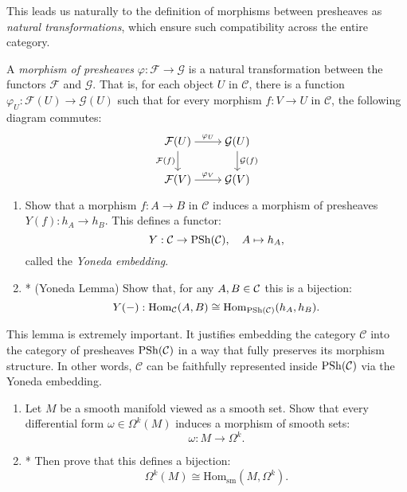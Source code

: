 This leads us naturally to the definition of morphisms between presheaves as \emph{natural transformations}, which ensure such compatibility across the entire category.

\begin{definition}
A \emph{morphism of presheaves} $\varphi: \mathcal{F} \to \mathcal{G}$ is a natural transformation between the functors $\mathcal{F}$ and $\mathcal{G}$. That is, for each object $U$ in $\mathcal{C}$, there is a function $\varphi_U: \mathcal{F}(U) \to \mathcal{G}(U)$ such that for every morphism $f: V \to U$ in $\mathcal{C}$, the following diagram commutes:
\[\begin{tikzcd}[ampersand replacement=\&,cramped]
  \mathcal{F}(U) \&  \mathcal{G}(U) \\
\mathcal{F}(V)   \& \mathcal{G}(V)
	\arrow["{\varphi_U}", from=1-1, to=1-2]
	\arrow["{\mathcal{F}(f)}"', from=1-1, to=2-1]
	\arrow["{\mathcal{G}(f)}", from=1-2, to=2-2]
	\arrow["{\varphi_V}", from=2-1, to=2-2]
\end{tikzcd}\]

\end{definition}
\begin{exercise}
\begin{enumerate}
    \item Show that a morphism $f: A \to B$ in $\mathcal{C}$ induces a morphism of presheaves $Y(f): h_A \to h_B$. This defines a functor:
    \[
    Y: \mathcal{C} \to \mathrm{PSh}(\mathcal{C}), \quad A \mapsto h_A,
    \]
    called the \emph{Yoneda embedding}.
    \item* (Yoneda Lemma) Show that, for any $A,B\in \mathcal{C}$ this is a bijection:
    \[
    Y(-): \mathrm{Hom}_{\mathcal{C}}(A, B) \cong \mathrm{Hom}_{\mathrm{PSh}(\mathcal{C})}(h_A, h_B).
    \]
\end{enumerate}
\end{exercise}

This lemma is extremely important. It justifies embedding the category $\mathcal{C}$ into the category of presheaves $\mathrm{PSh}(\mathcal{C})$ in a way that fully preserves its morphism structure. In other words, $\mathcal{C}$ can be faithfully represented inside $\mathrm{PSh}(\mathcal{C})$ via the Yoneda embedding.
\begin{exercise}
  \begin{enumerate}
    \item 
Let $M$ be a smooth manifold viewed as a smooth set. Show that every differential form $\omega \in \Omega^k(M)$ induces a morphism of smooth sets:
\[
\omega: M \to \Omega^k.
\]
\item* Then prove that this defines a bijection:
\[
\Omega^k(M) \cong \mathrm{Hom}_{\mathrm{sm}}(M, \Omega^k).
\]
  \end{enumerate}
\end{exercise}

